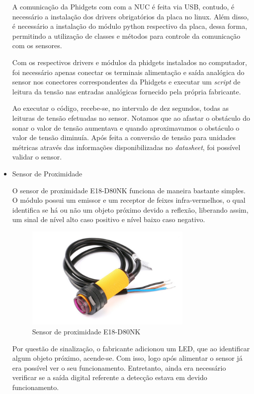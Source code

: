 \begin{itemize}
		A comunicação da Phidgets com com a NUC é feita via USB, contudo, é necessário a instalação dos drivers obrigatórios da placa no linux. Além disso, é necessário a instalação do módulo python respectivo da placa, dessa forma, permitindo a utilização de classes e métodos para controle da comunicação com os sensores.
		
		Com os respectivos drivers e módulos da phidgets instalados no computador, foi necessário apenas conectar os terminais alimentação e saída analógica do sensor nos conectores correspondentes da Phidgets e executar um \textit{script} de leitura da tensão nas entradas analógicas fornecido pela própria fabricante. 
		
		Ao executar o código, recebe-se, no intervalo de dez segundos, todas as leituras de tensão efetuadas no sensor. Notamos que ao afastar o obstáculo do sonar o valor de tensão aumentava e quando aproximavamos o obstáculo o valor de tensão diminuía. Após feita a conversão de tensão para unidades métricas através das informações disponibilizadas no \textit{datasheet}, foi possível validar o sensor.
		
		\item Sensor de Proximidade
		
		O sensor de proximidade E18-D80NK funciona de maneira bastante simples. O módulo possui um emissor e um receptor de feixes infra-vermelhos, o qual identifica se há ou não um objeto próximo devido a reflexão, liberando assim, um sinal de nível alto caso positivo e nível baixo caso negativo.
		
		\begin{figure}[!ht]
			\centering
			\includegraphics[width=8cm]{Figures/proximity_sensor.jpg}
			\caption{Sensor de proximidade E18-D80NK}
			\label{fig:E18-D80NK}
		\end{figure}
		
		Por questão de sinalização, o fabricante adicionou um LED, que ao identificar algum objeto próximo, acende-se. Com isso, logo após alimentar o sensor já era possível ver o seu funcionamento. Entretanto, ainda era necessário verificar se a saída digital referente a detecção estava em devido funcionamento.
		

\end{itemize}
